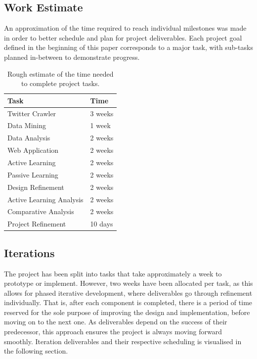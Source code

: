 \documentclass[a4paper,12pt]{article}
\begin{document}
\subsection{Work Estimate}
An approximation of the time required to reach individual milestones was made in order to better schedule and plan for project deliverables. Each project goal defined in the beginning of this paper corresponds to a major task, with sub-tasks planned in-between to demonstrate progress.
\begin{table}[H]
\centering
\begin{tabular}{|l l|} 
 \hline
 Task & Time \\ [0.3ex] 
 \hline\hline
 Twitter Crawler & 3 weeks\footnotemark[\value{footnote}] \\ 
 \hline
 Data Mining & 1 week \\
  \hline
 Data Analysis & 2 weeks \\
 \hline
 Web Application & 2 weeks \\
 \hline
 Active Learning & 2 weeks \\
 \hline
 Passive Learning & 2 weeks \\
 \hline
 Design Refinement & 2 weeks \\
 \hline
 Active Learning Analysis & 2 weeks \\
 \hline
 Comparative Analysis & 2 weeks \\
 \hline
 Project Refinement & 10 days \\
 \hline
\end{tabular}
\captionsetup{justification=centering}
\caption{Rough estimate of the time needed to complete project tasks.}
\end{table}
\subsection{Iterations}
The project has been split into tasks that take approximately a week to prototype or implement. However, two weeks have been allocated per task, as this allows for phased iterative development, where deliverables go through refinement individually. That is, after each component is completed, there is a period of time reserved for the sole purpose of improving the design and implementation, before moving on to the next one. As deliverables depend on the success of their predecessor, this approach ensures the project is always moving forward smoothly. Iteration deliverables and their respective scheduling is visualised in the following section.
\end{document}
